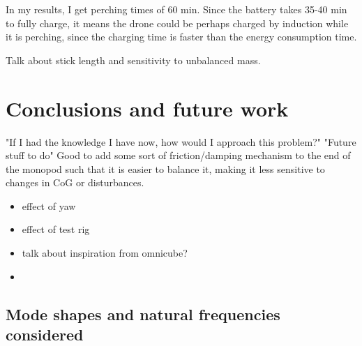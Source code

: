 \documentclass[12pt,a4paper]{article}
\begin{document}
In my results, I get perching times of 60 min. Since the battery takes 35-40 min to fully charge, it means the drone could be perhaps charged by induction while it is perching, since the charging time is faster than the energy consumption time.

Talk about stick length and sensitivity to unbalanced mass.
\section{Conclusions and future work}
"If I had the knowledge I have now, how would I approach this problem?"
"Future stuff to do"
Good to add some sort of friction/damping mechanism to the end of the monopod such that it is easier to balance it, making it less sensitive to changes in CoG or disturbances.
\begin{itemize}

\item effect of yaw
\item effect of test rig
\item talk about inspiration from omnicube?
\item   \end{itemize}





\pagebreak
\begin{appendices}
\section{Mode shapes and natural frequencies considered}

\end{appendices}
\end{document}
